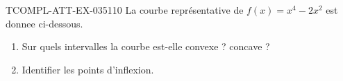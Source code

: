 \begin{exercice}{TCOMPL-ATT-EX-035}{1}{10}
La courbe représentative de $f(x) = x^4 - 2x^2$ est donnee ci-dessous.
\begin{enumerate}
  \item Sur quels intervalles la courbe est-elle convexe ? concave ?
  \item Identifier les points d'inflexion.
\end{enumerate}

\end{exercice}
